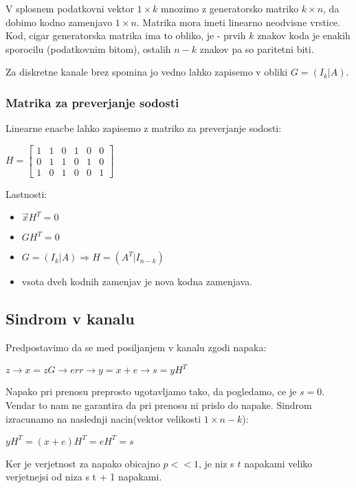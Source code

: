 \documentclass{article}
\begin{document}
\begin{multicols}{3}
V splosnem podatkovni vektor $1 \times k$ mnozimo z generatorsko matriko $k \times n$, da dobimo kodno zamenjavo
$1 \times n$. Matrika mora imeti linearno neodvisne vrstice. Kod, cigar generatorska matrika ima to obliko, je
 - prvih $k$ znakov koda je enakih sporocilu (podatkovnim bitom), ostalih $n-k$ znakov pa so
paritetni biti.

Za diskretne kanale brez spomina jo vedno lahko zapisemo v obliki $G = (I_k | A)$.

\subsubsection{Matrika za preverjanje sodosti}
Linearne enacbe lahko zapisemo z matriko za preverjanje sodosti:

\begin{center}
    \begin{math}
        H =
        \begin{bmatrix}
            1 & 1 & 0 & 1 & 0 & 0 \\
            0 & 1 & 1 & 0 & 1 & 0 \\
            1 & 0 & 1 & 0 & 0 & 1 
        \end{bmatrix}
    \end{math}
\end{center}

Lastnosti:
\begin{itemize}
    \item $\vec{x}H^T = 0$
    \item $GH^T = 0$
    \item $G = (I_k | A) \Rightarrow H = (A^T | I_{n-k})$
    \item vsota dveh kodnih zamenjav je nova kodna zamenjava.
\end{itemize}

\subsection{Sindrom v kanalu}
Predpostavimo da se med posiljanjem v kanalu zgodi napaka:
\begin{center}
    \begin{math}
        z \rightarrow x = zG \rightarrow err\rightarrow y = x + e \rightarrow s = yH^T
    \end{math}
\end{center}
Napako pri prenosu preprosto ugotavljamo tako, da pogledamo, ce je $s = 0$. Vendar to nam ne garantira da pri prenosu ni prislo do napake.
Sindrom izracunamo na naslednji nacin(vektor velikosti $1 \times n - k$):
\begin{center}
    \begin{math}
        yH^T = (x + e)H^T = eH^T = s
    \end{math}
\end{center}
Ker je verjetnost za napako obicajno $p << 1$, je niz s $t$ napakami veliko
verjetnejsi od niza s t + 1 napakami.


\end{multicols}
\end{document}
